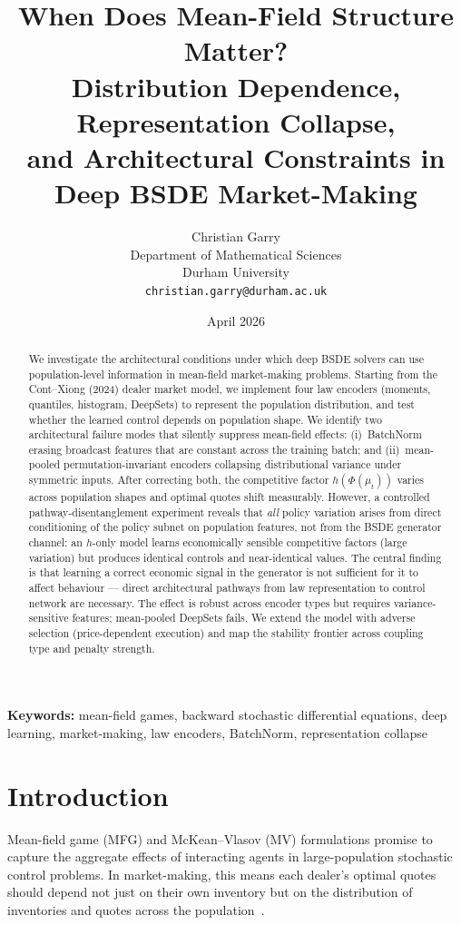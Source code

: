\documentclass[11pt,a4paper]{article}
\title{When Does Mean-Field Structure Matter?\\Distribution Dependence, Representation Collapse,\\and Architectural Constraints in Deep BSDE Market-Making}
\author{
  Christian Garry \\
  Department of Mathematical Sciences \\
  Durham University \\
  \texttt{christian.garry@durham.ac.uk}
}
\date{April 2026}
\begin{document}
\maketitle

\begin{abstract}
We investigate the architectural conditions under which deep BSDE solvers can use population-level information in mean-field market-making problems. Starting from the Cont--Xiong (2024) dealer market model, we implement four law encoders (moments, quantiles, histogram, DeepSets) to represent the population distribution, and test whether the learned control depends on population shape. We identify two architectural failure modes that silently suppress mean-field effects: (i)~BatchNorm erasing broadcast features that are constant across the training batch; and (ii)~mean-pooled permutation-invariant encoders collapsing distributional variance under symmetric inputs. After correcting both, the competitive factor $h(\Phi(\mu_t))$ varies across population shapes and optimal quotes shift measurably. However, a controlled pathway-disentanglement experiment reveals that \emph{all} policy variation arises from direct conditioning of the policy subnet on population features, not from the BSDE generator channel: an $h$-only model learns economically sensible competitive factors (large variation) but produces identical controls and near-identical values. The central finding is that learning a correct economic signal in the generator is not sufficient for it to affect behaviour --- direct architectural pathways from law representation to control network are necessary. The effect is robust across encoder types but requires variance-sensitive features; mean-pooled DeepSets fails. We extend the model with adverse selection (price-dependent execution) and map the stability frontier across coupling type and penalty strength.
\end{abstract}

\noindent\textbf{Keywords:} mean-field games, backward stochastic differential equations, deep learning, market-making, law encoders, BatchNorm, representation collapse

\section{Introduction}
\label{sec:intro}

Mean-field game (MFG) and McKean--Vlasov (MV) formulations promise to capture the aggregate effects of interacting agents in large-population stochastic control problems. In market-making, this means each dealer's optimal quotes should depend not just on their own inventory but on the distribution of inventories and quotes across the population~\cite{cont2024dynamics, carmona2018probabilistic}.
\end{document}
